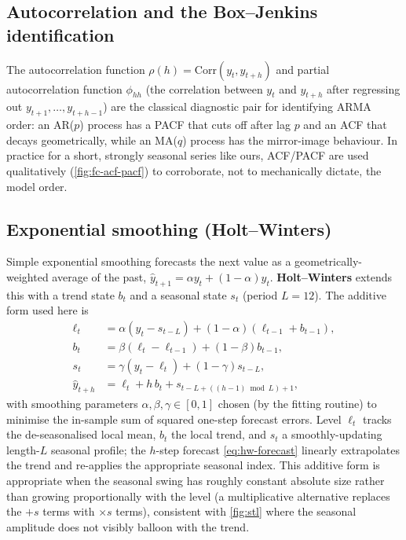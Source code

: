 \subsection{Autocorrelation and the Box--Jenkins identification}
The autocorrelation function $\rho(h) = \mathrm{Corr}(y_t, y_{t+h})$ and
partial autocorrelation function $\phi_{hh}$ (the correlation between
$y_t$ and $y_{t+h}$ after regressing out $y_{t+1},\dots,y_{t+h-1}$) are
the classical diagnostic pair for identifying ARMA order: an AR($p$)
process has a PACF that cuts off after lag $p$ and an ACF that decays
geometrically, while an MA($q$) process has the mirror-image behaviour.
In practice for a short, strongly seasonal series like ours, ACF/PACF are
used qualitatively (\cref{fig:fc-acf-pacf}) to corroborate, not to
mechanically dictate, the model order.

\subsection{Exponential smoothing (Holt--Winters)}
Simple exponential smoothing forecasts the next value as a
geometrically-weighted average of the past, $\hat y_{t+1} = \alpha y_t +
(1-\alpha)\hat y_t$. \textbf{Holt--Winters} extends this with a trend
state $b_t$ and a seasonal state $s_t$ (period $L=12$). The additive
form used here is
\begin{align}
  \ell_t &= \alpha (y_t - s_{t-L}) + (1-\alpha)(\ell_{t-1}+b_{t-1}), \label{eq:hw-level}\\
  b_t &= \beta (\ell_t - \ell_{t-1}) + (1-\beta) b_{t-1}, \label{eq:hw-trend}\\
  s_t &= \gamma (y_t - \ell_t) + (1-\gamma) s_{t-L}, \label{eq:hw-season}\\
  \hat y_{t+h} &= \ell_t + h\,b_t + s_{t-L+((h-1)\bmod L)+1}, \label{eq:hw-forecast}
\end{align}
with smoothing parameters $\alpha,\beta,\gamma \in [0,1]$ chosen (by the
fitting routine) to minimise the in-sample sum of squared one-step
forecast errors. Level $\ell_t$ tracks the de-seasonalised local mean,
$b_t$ the local trend, and $s_t$ a smoothly-updating length-$L$ seasonal
profile; the $h$-step forecast \cref{eq:hw-forecast} linearly extrapolates
the trend and re-applies the appropriate seasonal index. This additive
form is appropriate when the seasonal swing has roughly constant absolute
size rather than growing proportionally with the level (a multiplicative
alternative replaces the $+s$ terms with $\times s$ terms), consistent
with \cref{fig:stl} where the seasonal amplitude does not visibly balloon
with the trend.

